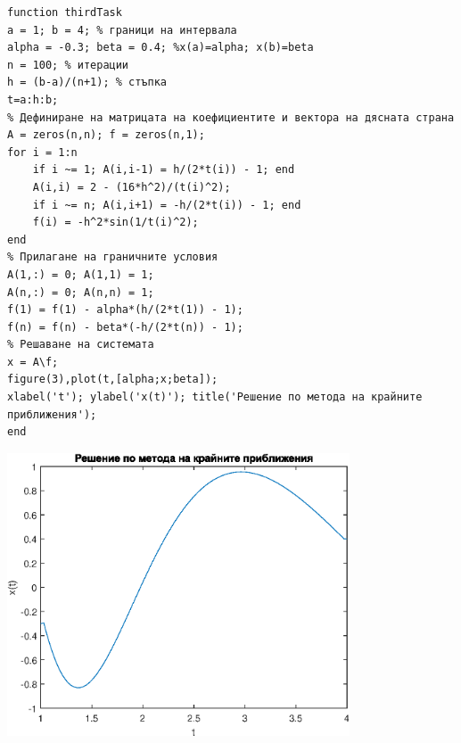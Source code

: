\documentclass[a4paper,fleqn,12pt]{article}
\begin{document}
\begin{verbatim}
function thirdTask
a = 1; b = 4; % граници на интервала
alpha = -0.3; beta = 0.4; %x(a)=alpha; x(b)=beta
n = 100; % итерации
h = (b-a)/(n+1); % стъпка
t=a:h:b;
% Дефиниране на матрицата на коефициентите и вектора на дясната страна
A = zeros(n,n); f = zeros(n,1);
for i = 1:n
    if i ~= 1; A(i,i-1) = h/(2*t(i)) - 1; end
    A(i,i) = 2 - (16*h^2)/(t(i)^2);
    if i ~= n; A(i,i+1) = -h/(2*t(i)) - 1; end
    f(i) = -h^2*sin(1/t(i)^2);
end
% Прилагане на граничните условия
A(1,:) = 0; A(1,1) = 1;
A(n,:) = 0; A(n,n) = 1;
f(1) = f(1) - alpha*(h/(2*t(1)) - 1);
f(n) = f(n) - beta*(-h/(2*t(n)) - 1);
% Решаване на системата
x = A\f;
figure(3),plot(t,[alpha;x;beta]);
xlabel('t'); ylabel('x(t)'); title('Решение по метода на крайните приближения');
end
\end{verbatim}
\begin{center}
  \includegraphics[width=4in]{thirdTask_01.eps}
\end{center}

\newpage
\end{document}
